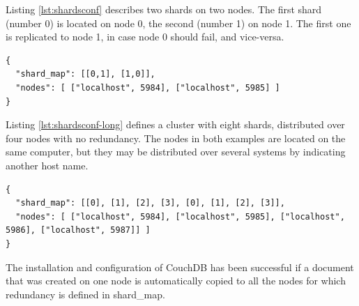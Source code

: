 Listing \ref{lst:shardsconf} describes two shards on two nodes. The first shard (number 0) is located on node 0, the second (number 1) on node 1. The first one is replicated to node 1, in case node 0 should fail, and vice-versa.

\lstset{language=bash}
\medskip
\begin{lstlisting}[caption=shards.conf with two nodes and simple redundancy, label=lst:shardsconf]
{
  "shard_map": [[0,1], [1,0]],
  "nodes": [ ["localhost", 5984], ["localhost", 5985] ]
}
\end{lstlisting}

Listing \ref{lst:shardsconf-long} defines a cluster with eight shards, distributed over four nodes with no redundancy. The nodes in both examples are located on the same computer, but they may be distributed over several systems by indicating another host name.

\medskip
\begin{lstlisting}[caption=shards.conf with four nodes and no redundancy and simple oversharding, label=lst:shardsconf-long]
{
  "shard_map": [[0], [1], [2], [3], [0], [1], [2], [3]],
  "nodes": [ ["localhost", 5984], ["localhost", 5985], ["localhost", 5986], ["localhost", 5987]] ]
}
\end{lstlisting}

The installation and configuration of CouchDB has been successful if a document that was created on one node is automatically copied to all the nodes for which redundancy is defined in {\selectfont shard\_map}.